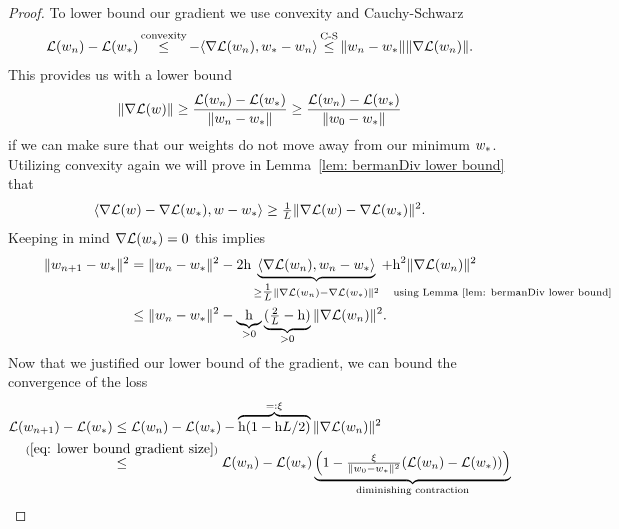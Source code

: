 \begin{proof}
	To lower bound our gradient we use convexity and Cauchy-Schwarz
	\begin{align*}
		\Loss(\weights_n)-\Loss(\minimum)
		\xle{\text{convexity}} -\langle \nabla\Loss(\weights_n), \minimum-\weights_n\rangle
		\xle{\text{C-S}} \|\weights_n - \minimum\| \|\nabla\Loss(\weights_n)\|.
	\end{align*}
	This provides us with a lower bound 
	\begin{align}\label{eq: lower bound gradient size}
		\|\nabla\mathcal{L}(w)\|
		\ge \frac{\mathcal{L}(w_n)-\mathcal{L}(w_*)}{\|w_n-w_*\|}
		\ge \frac{\mathcal{L}(w_n)-\mathcal{L}(w_*)}{\|w_0-w_*\|}
	\end{align}
	if we can make sure that our weights do not move away from our minimum \(w_*\).
	Utilizing convexity again we will prove in Lemma~\ref{lem: bermanDiv lower
	bound} that
	\begin{align*}
		\langle\nabla\mathcal{L}(w) - \nabla\mathcal{L}(w_*), w-w_*\rangle
		\ge \tfrac1{L} \|\nabla\mathcal{L}(w) - \nabla\mathcal{L}(w_*)\|^2.
	\end{align*}
	Keeping in mind \(\nabla \mathcal{L}(w_*)=0\) this implies
	\begin{align}
		\nonumber
		\|\weights_{n+1} - \minimum\|^2
		&= \|\weights_n - \minimum\|^2
		- 2\lr\underbrace{
			\langle \nabla\Loss(\weights_n), \weights_n - \minimum\rangle
		}_{
			\ge \tfrac{1}\ubound \|\nabla \Loss (\weights_n) - \nabla\Loss(\minimum)\|^2
			\mathrlap{\quad \text{using Lemma~\ref{lem: bermanDiv lower bound}}}
		} + \lr^2\|\nabla \Loss(\weights_n)\|^2
		\\
		&\le \|\weights_n - \minimum\|^2 - 
		\underbrace{\lr}_{>0}\underbrace{(\tfrac{2}{\ubound}-\lr)}_{>0}
		\|\nabla\Loss(\weights_n)\|^2.
		\label{eq: decreasing weight difference}
	\end{align}
	Now that we justified our lower bound of the gradient, we can bound the
	convergence of the loss
	\begin{align*}
		\Loss(\weights_{n+1}) - \Loss(\minimum)
		&\le \Loss(\weights_n)-\Loss(\minimum)
		- \overbrace{\lr(1-\lr\ubound/2)}^{=:\xi} \|\nabla \Loss(\weights_n)\|^2\\
		&\lxle{(\ref{eq: lower bound gradient size})}
		\Loss(\weights_n)-\Loss(\minimum)
		\underbrace{
			\left(1 - \tfrac{\xi}{\|\weights_0-\minimum\|^2}(\Loss(\weights_n)-\Loss(\minimum))\right)
		}_{\text{diminishing contraction}}
	\end{align*}

\end{proof}
